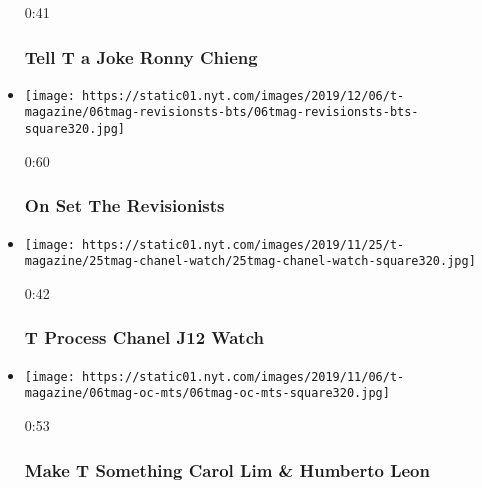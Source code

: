 \begin{itemize}
  0:41

  \hypertarget{tell-t-a-joke--ronny-chieng}{%
  \subsubsection{Tell T a Joke \textbar{} Ronny
  Chieng}\label{tell-t-a-joke--ronny-chieng}}
\item
  \href{https://www.nytimes.com/video/t-magazine/100000006856148/on-set-the-revisionists.html?action=click\&module=video-series-bar\&region=header\&pgtype=Article\&playlistId=video/t-magazine}{}

  \texttt{[image: https://static01.nyt.com/images/2019/12/06/t-magazine/06tmag-revisionsts-bts/06tmag-revisionsts-bts-square320.jpg]}

  0:60

  \hypertarget{on-set--the-revisionists}{%
  \subsubsection{On Set \textbar{} The
  Revisionists}\label{on-set--the-revisionists}}
\item
  \href{https://www.nytimes.com/video/t-magazine/100000006834800/t-process-chanel-j12-watch.html?action=click\&module=video-series-bar\&region=header\&pgtype=Article\&playlistId=video/t-magazine}{}

  \texttt{[image: https://static01.nyt.com/images/2019/11/25/t-magazine/25tmag-chanel-watch/25tmag-chanel-watch-square320.jpg]}

  0:42

  \hypertarget{t-process--chanel-j12-watch}{%
  \subsubsection{T Process \textbar{} Chanel J12
  Watch}\label{t-process--chanel-j12-watch}}
\item
  \href{https://www.nytimes.com/video/t-magazine/100000006806415/make-t-something-carol-lim-humberto-leon.html?action=click\&module=video-series-bar\&region=header\&pgtype=Article\&playlistId=video/t-magazine}{}

  \texttt{[image: https://static01.nyt.com/images/2019/11/06/t-magazine/06tmag-oc-mts/06tmag-oc-mts-square320.jpg]}

  0:53

  \hypertarget{make-t-something--carol-lim--humberto-leon}{%
  \subsubsection{Make T Something \textbar{} Carol Lim \& Humberto
  Leon}\label{make-t-something--carol-lim--humberto-leon}}
\end{itemize}

